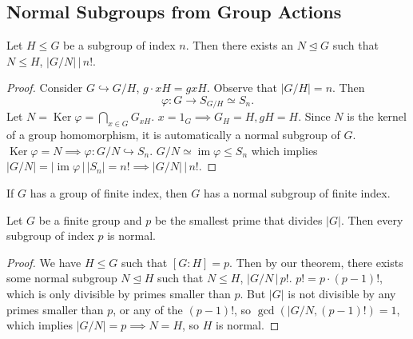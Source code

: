 \subsection{Normal Subgroups from Group Actions}
\begin{theorem}
    Let $H \leq G$ be a subgroup of index $n$. Then there exists an $N \trianglelefteq G$ such that $N \leq H$, $|G/N| \,\big|\, n!$.
\end{theorem}
\begin{proof}
Consider $G \hookrightarrow G/H$, $g\cdot xH=gxH$. Observe that $|G/H|=n$. Then \[
\varphi \colon G \to S_{G/H} \simeq S_n.
\] Let $N=\operatorname{Ker}\varphi=\bigcap_{x\in G} G_{xH}$. $x=1_G \implies G_H=H, gH=H$. Since $N$ is the kernel of a group homomorphism, it is automatically a normal subgroup of $G$. $\operatorname{Ker}\varphi=N \implies  \varphi: G/N \hookrightarrow S_n$. $G/N \simeq \operatorname{im}\varphi \leq S_n$ which implies $|G/N| = |\operatorname{im}\varphi \,\big| \, |S_n| = n! \implies |G/N| \,\big|\, n!$.

\end{proof}
\begin{cor}
    If $G$ has a group of finite index, then $G$ has a normal subgroup of finite index.
\end{cor}
\begin{cor}
    Let $G$ be a finite group and $p$ be the smallest prime that divides $|G|$. Then every subgroup of index $p$ is normal.
\end{cor}
\begin{proof}
    We have $H \leq G$ such that $[G:H]=p$. Then by our theorem, there exists some normal subgroup $N \trianglelefteq H$ such that $N \leq H$, $|G/N \,\big|\, p!$. $p!=p\cdot (p-1)!$, which is only divisible by primes smaller than $p$. But $|G|$ is not divisible by any primes smaller than $p$, or any of the $(p-1)!$, so $\gcd\left( |G /N, (p-1)! \right)=1 $, which implies $|G /N|=p \implies N=H$, so $H$ is normal.
\end{proof}

